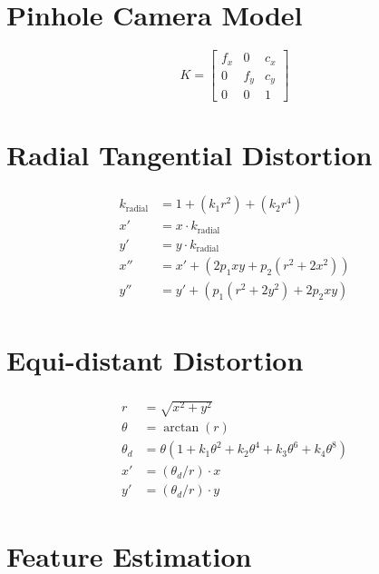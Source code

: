 \section{Pinhole Camera Model}

\begin{equation}
  K =
  \begin{bmatrix}
    f_x & 0 & c_x \\
    0 & f_y & c_y \\
    0 & 0 & 1
  \end{bmatrix}
\end{equation}



\section{Radial Tangential Distortion}

\begin{align}
\begin{split}
  k_{\text{radial}} &= 1 + (k_1 r^2) + (k_2 r^4) \\
  x' &= x \cdot k_{\text{radial}} \\
  y' &= y \cdot k_{\text{radial}} \\
  x'' &= x' + (2 p_1 x y + p_2 (r^2 + 2 x^2)) \\
  y'' &= y' + (p_1 (r^2 + 2 y^2) + 2 p_2 x y)
\end{split}
\end{align}



\section{Equi-distant Distortion}

\begin{align}
\begin{split}
  r &= \sqrt{x^{2} + y^{2}} \\
  \theta &= \arctan{(r)} \\
  \theta_d &= \theta (1 + k_1 \theta^2 + k_2 \theta^4 + k_3 \theta^6 + k_4 \theta^8) \\
  x' &= (\theta_d / r) \cdot x \\
  y' &= (\theta_d / r) \cdot y
\end{split}
\end{align}



\section{Feature Estimation}
\label{sec:feature_estimation}

